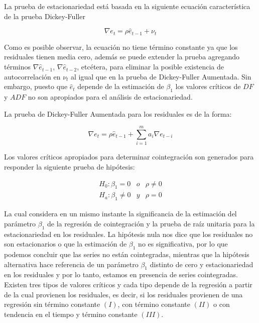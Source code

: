La prueba de estacionariedad está basada en la siguiente ecuación característica de la prueba Dickey-Fuller

\begin{equation}
\nabla e_t= \rho \hat{e}_{t-1} + \nu_t
\end{equation}

Como es posible observar, la ecuación no tiene término constante ya que los residuales tienen media cero, además se puede extender la prueba agregando términos $\nabla \hat{e}_{t-1}$, $\nabla \hat{e}_{t-2}$, etcétera, para eliminar la posible existencia de autocorrelación en $\nu_t$ al igual que en la prueba de Dickey-Fuller Aumentada. Sin embargo, puesto que $\hat{e}_t$ depende de la estimación de $\beta_1$ los valores críticos de $DF$ y $ADF$ no son apropiados para el análisis de estacionariedad. \bigskip

La prueba de Dickey-Fuller Aumentada para los residuales es de la forma:

\begin{equation}
\nabla e_t= \rho \hat{e}_{t-1} + \sum_{i=1}^{m} a_i \nabla e_{t-i}
\end{equation}

Los valores críticos apropiados para determinar cointegración son generados para responder la siguiente prueba de hipótesis:

   \begin{eqnarray}
    H_0: \beta_1= 0 & o  &  \rho \neq 0   \\ 
    H_a: \beta_1 \neq 0 & y & \rho=0 \nonumber
   \end{eqnarray} 
   
La cual considera en un mismo instante la significancia de la estimación del parámetro $\beta_1$ de la regresión de cointegración y la prueba de raíz unitaria para la estacionariedad en los residuales. La hipótesis nula nos dice que los residuales no son estacionarios o que la estimación de $\beta_1$ no es significativa, por lo que podemos concluir que las series no están cointegradas, mientras que la hipótesis alternativa hace referencia de un parámetro $\beta_1$ distinto de cero y estacionariedad en los residuales y por lo tanto, estamos en presencia de series cointegradas. Existen tres tipos de valores críticos y cada tipo depende de la regresión a partir de la cual provienen los residuales, es decir, si los residuales provienen de una regresión sin término constante $(I)$, con término constante $(II)$ o con tendencia en el tiempo y término constante $(III)$. 

